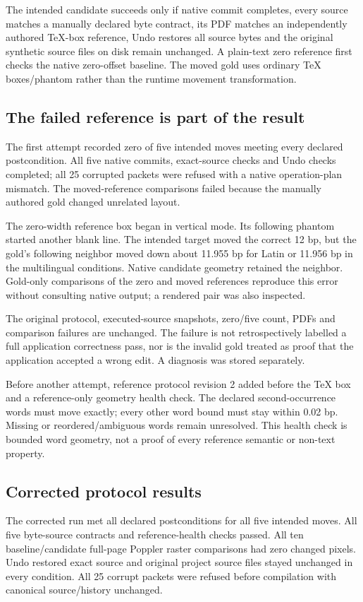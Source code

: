 The intended candidate succeeds only if native commit completes, every source
matches a manually declared byte contract, its PDF matches an independently
authored TeX-box reference, Undo restores all source bytes and the original
synthetic source files on disk remain unchanged. A plain-text zero reference
first checks the native zero-offset baseline. The moved gold uses ordinary
TeX boxes/phantom rather than the runtime movement transformation.

\subsection{The failed reference is part of the result}
The first attempt recorded zero of five intended moves meeting every declared
postcondition. All five native commits, exact-source checks and Undo checks
completed; all 25 corrupted packets were refused with a native operation-plan
mismatch. The moved-reference comparisons failed because the manually authored
gold changed unrelated layout.

The zero-width reference box began in vertical mode. Its following phantom
started another blank line. The intended target moved the correct 12 bp, but
the gold's following neighbor moved down about 11.955 bp for Latin or
11.956 bp in the multilingual conditions. Native candidate geometry retained
the neighbor. Gold-only comparisons of the zero and moved references reproduce
this error without consulting native output; a rendered pair was also inspected.

The original protocol, executed-source snapshots, zero/five count, PDFs and
comparison failures are unchanged. The failure is not retrospectively labelled
a full application correctness pass, nor is the invalid gold treated as proof
that the application accepted a wrong edit. A diagnosis was stored separately.

Before another attempt, reference protocol revision 2 added 
before the TeX box and a reference-only geometry health check. The declared
second-occurrence words must move exactly; every other word bound must stay
within 0.02 bp. Missing or reordered/ambiguous words remain unresolved. This
health check is bounded word geometry, not a proof of every reference semantic
or non-text property.

\subsection{Corrected protocol results}
The corrected run met all declared postconditions for all five intended moves.
All five byte-source contracts and reference-health checks passed. All ten
baseline/candidate full-page Poppler raster comparisons had zero changed
pixels. Undo restored exact source and original project source files stayed
unchanged in every condition. All 25 corrupt packets were refused before
compilation with canonical source/history unchanged.

